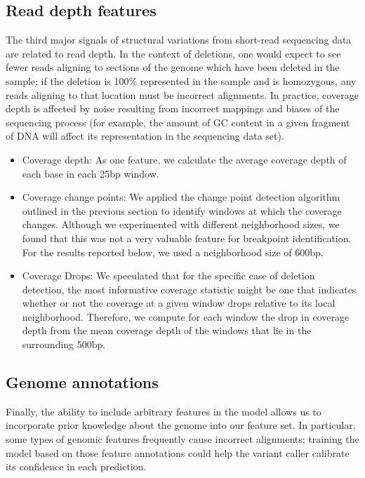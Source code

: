 \subsection{Read depth features}

The third major signals of structural variations from short-read sequencing data are related to read depth. In the context of deletions, one would expect to see fewer reads aligning to sections of the genome which have been deleted in the sample; if the deletion is 100\% represented in the sample and is homozygous, any reads aligning to that location must be incorrect alignments. In practice, coverage depth is affected by noise resulting from incorrect mappings and biases of the sequencing process (for example, the amount of GC content in a given fragment of DNA will affect its representation in the sequencing data set). 

\begin{itemize}
\item Coverage depth: As one feature, we calculate the average coverage depth of each base in each 25bp window.

\item Coverage change points: We applied the change point detection algorithm outlined in the previous section to identify windows at which the coverage changes. Although we experimented with different neighborhood sizes, we found that this was not a very valuable feature for breakpoint identification. For the results reported below, we used a neighborhood size of 600bp.

\item Coverage Drops: We speculated that for the specific case of deletion detection, the most informative coverage statistic might be one that indicates whether or not the coverage at a given window drops relative to its local neighborhood. Therefore, we compute for each window the drop in coverage depth from the mean coverage depth of the windows that lie in the surrounding 500bp.
\end{itemize}

\subsection{Genome annotations}

Finally, the ability to include arbitrary features in the model allows us to incorporate prior knowledge about the genome into our feature set. In particular, some types of genomic features frequently cause incorrect alignments; training the model based on those feature annotations could help the variant caller calibrate its confidence in each prediction.

